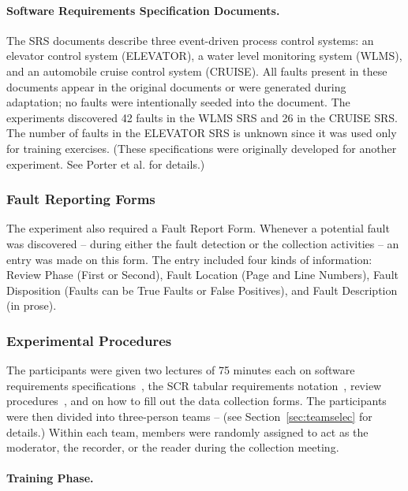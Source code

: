 \paragraph{Software Requirements Specification Documents.}
\label{srs}
The SRS documents describe three event-driven process control 
systems: an elevator control system (ELEVATOR), 
a water level monitoring system (WLMS),
and an automobile cruise control system (CRUISE). 
All faults present in these documents appear in 
the original documents or were generated 
during adaptation; no faults were intentionally seeded into the document. 
The experiments discovered 42 faults in the WLMS SRS 
and 26 in the CRUISE SRS. The number of faults in the  
ELEVATOR SRS is unknown since it was used only for training exercises. 
(These specifications were originally developed 
for another experiment. See Porter et al.\cite{PVB:TSE94}
for details.)

\subsubsection{Fault Reporting Forms}
\label{forms} 

The experiment also required a Fault Report Form. Whenever a 
potential fault was discovered -- during either
the fault detection or the collection activities 
--  an entry was made on this form.  The entry 
included four kinds of information:  
Review Phase (First or Second),
Fault Location (Page and Line Numbers),
Fault Disposition (Faults can be True Faults or False Positives), 
and Fault Description (in prose).

\subsubsection{Experimental Procedures}
\label{preparation}

The participants were given two lectures of 75 minutes each on  
software requirements specifications~\cite{ieee.1984},
the SCR tabular requirements notation~\cite{heninger80},
review procedures~\cite{Fagan76,parnas.1985}, and on how 
to fill out the data collection forms. 
The participants were then divided into 
three-person teams -- (see Section~\ref{sec:teamselec} 
for details.) Within each team, members were randomly assigned 
to act as the moderator, the recorder, or the reader during the
collection meeting.

\label{conducting}

\paragraph{Training Phase.}


